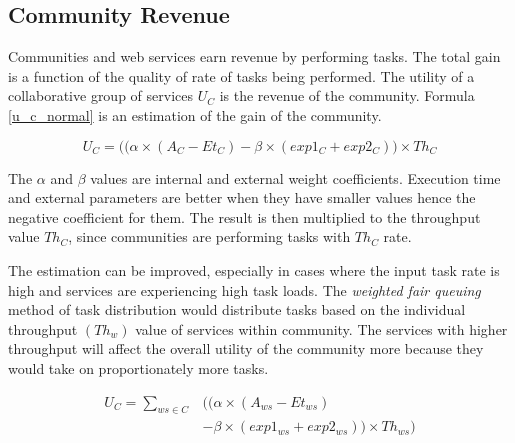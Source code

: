 \documentclass[10pt,journal,cspaper,compsoc]{IEEEtran}
\begin{document}
\subsection{Community Revenue}

Communities and web services earn revenue by performing tasks. The total gain is a function of the quality of rate of tasks being performed. The utility of a collaborative group of services $U_{C}$ is the revenue of the community. Formula \ref{u_c_normal} is an estimation of the gain of the community.

\begin{equation}\label{u_c_normal}
U_{C} = \big((\alpha \times (A_{C} - Et_{C}) - \beta \times (exp1_{C} + exp2_{C})\big) \times Th_{C}
\end{equation}

The $\alpha$ and $\beta$ values are internal and external weight coefficients. Execution time and external parameters are better when they have smaller values hence the negative coefficient for them. The result is then multiplied to the throughput value $Th_{C}$, since communities are performing tasks with $Th_{C}$ rate.

The estimation can be improved, especially in cases where the input task rate is high and services are experiencing high task loads. The \emph{weighted fair queuing} method of task distribution would distribute tasks based on the individual throughput $(Th_{w})$ value of services within community. The services with higher throughput will affect the overall utility of the community more because they would take on proportionately more tasks.

\begin{equation}\label{u_c_load}
\begin{split}
U_{C} = \sum_{ws \in C}&\bigg(\big(\alpha \times (A_{ws} - Et_{ws}) \\
        & - \beta \times (exp1_{ws} + exp2_{ws})\big) \times Th_{ws}\bigg)
\end{split}
\end{equation}
\end{document}
